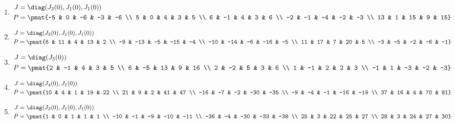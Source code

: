 \begin{enumerate}
\item

\begin{align*}
J &= \diag(J_{3}(0), J_{1}(0), J_{1}(0))\\
P &= \pmat{-5 & 0 & -6 & -3 & -6 \\ 5 & 0 & 4 & 3 & 5 \\ 6 & -1 & 4 & 3 & 6 \\ -2 & -1 & -4 & -2 & -3 \\ 13 & 1 & 15 & 9 & 15}
\end{align*}

\item

\begin{align*}
J &= \diag(J_{3}(0), J_{1}(0), J_{1}(0))\\
P &= \pmat{6 & 11 & 4 & 13 & 2 \\ -9 & -13 & -5 & -15 & -4 \\ -10 & -14 & -6 & -16 & -5 \\ 11 & 17 & 7 & 20 & 5 \\ -3 & -5 & -2 & -6 & -1}
\end{align*}

\item

\begin{align*}
J &= \diag(J_{5}(0))\\
P &= \pmat{2 & -1 & 4 & 3 & 5 \\ 6 & -5 & 13 & 9 & 16 \\ 2 & -2 & 5 & 3 & 6 \\ 1 & -1 & 2 & 2 & 3 \\ -1 & 1 & -3 & -2 & -3}
\end{align*}

\item

\begin{align*}
J &= \diag(J_{4}(0), J_{1}(0))\\
P &= \pmat{10 & 4 & 1 & 19 & 22 \\ 21 & 9 & 2 & 41 & 47 \\ -16 & -7 & -2 & -30 & -35 \\ -9 & -4 & -1 & -16 & -19 \\ 37 & 16 & 4 & 70 & 81}
\end{align*}

\item

\begin{align*}
J &= \diag(J_{3}(0), J_{1}(0), J_{1}(0))\\
P &= \pmat{1 & 0 & 1 & 1 & 1 \\ -10 & -1 & -9 & -10 & -11 \\ -36 & -4 & -30 & -33 & -38 \\ 25 & 3 & 22 & 25 & 27 \\ 28 & 3 & 24 & 27 & 30}
\end{align*}


\end{enumerate}
